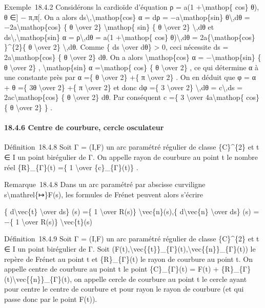 \documentclass[]{article}
\begin{document}
Exemple~18.4.2 Considérons la cardioïde d'équation ρ = a(1
+\textbackslash{}mathop\{ cos\} θ), θ ∈{]} − π,π{[}. On a alors
ds\textbackslash{},\textbackslash{}mathop\{cos\} α = dρ =
−a\textbackslash{}mathop\{sin\} θ\textbackslash{},dθ =
−2a\textbackslash{}mathop\{cos\} \{ θ \textbackslash{}over 2\}
\textbackslash{}mathop\{ sin\} \{ θ \textbackslash{}over 2\}
\textbackslash{},dθ et ds\textbackslash{},\textbackslash{}mathop\{sin\}
α = ρ\textbackslash{},dθ = a(1 +\textbackslash{}mathop\{ cos\}
θ)\textbackslash{},dθ = 2a\{\textbackslash{}mathop\{cos\} \}\^{}\{2\}\{
θ \textbackslash{}over 2\} \textbackslash{},dθ. Comme \{ ds
\textbackslash{}over dθ\} \textgreater{} 0, ceci nécessite ds =
2a\textbackslash{}mathop\{cos\} \{ θ \textbackslash{}over 2\} dθ. On a
alors \textbackslash{}mathop\{cos\} α = −\textbackslash{}mathop\{sin\}
\{ θ \textbackslash{}over 2\} , \textbackslash{}mathop\{sin\} α
=\textbackslash{}mathop\{ cos\} \{ θ \textbackslash{}over 2\} , ce qui
détermine α à une constante près par α =\{ θ \textbackslash{}over 2\}
+\{ π \textbackslash{}over 2\} . On en déduit que φ = α + θ =\{ 3θ
\textbackslash{}over 2\} +\{ π \textbackslash{}over 2\} et donc dφ =\{ 3
\textbackslash{}over 2\} \textbackslash{},dθ = c\textbackslash{},ds =
2ac\textbackslash{}mathop\{cos\} \{ θ \textbackslash{}over 2\} dθ. Par
conséquent c =\{ 3 \textbackslash{}over 4a\textbackslash{}mathop\{ cos\}
\{ θ \textbackslash{}over 2\} \} .

\paragraph{18.4.6 Centre de courbure, cercle osculateur}

Définition~18.4.8 Soit Γ = (I,F) un arc paramétré régulier de classe
\{C\}\^{}\{2\} et t ∈ I un point birégulier de Γ. On appelle rayon de
courbure au point t le nombre réel \{R\}\_\{Γ\}(t) =\{ 1
\textbackslash{}over \{c\}\_\{Γ\}(t)\} .

Remarque~18.4.8 Dans un arc paramétré par abscisse curviligne
s\textbackslash{}mathrel\{↦\}F(s), les formules de Frénet peuvent alors
s'écrire

\{ d\textbackslash{}vec\{t\} \textbackslash{}over ds\} (s) =\{ 1
\textbackslash{}over R(s)\} \textbackslash{}vec\{n\}(s),\{
d\textbackslash{}vec\{n\} \textbackslash{}over ds\} (s) = −\{ 1
\textbackslash{}over R(s)\} \textbackslash{}vec\{t\}(s)

Définition~18.4.9 Soit Γ = (I,F) un arc paramétré régulier de classe
\{C\}\^{}\{2\} et t ∈ I un point birégulier de Γ. Soit
(F(t),\textbackslash{}vec\{\{t\}\}\_\{Γ\}(t),\textbackslash{}vec\{\{n\}\}\_\{Γ\}(t))
le repère de Frénet au point t et \{R\}\_\{Γ\}(t) le rayon de courbure
au point t. On appelle centre de courbure au point t le point
\{C\}\_\{Γ\}(t) = F(t) +
\{R\}\_\{Γ\}(t)\textbackslash{}vec\{\{n\}\}\_\{Γ\}(t), on appelle cercle
de courbure au point t le cercle ayant pour centre le centre de courbure
et pour rayon le rayon de courbure (et qui passe donc par le point
F(t)).
\end{document}
